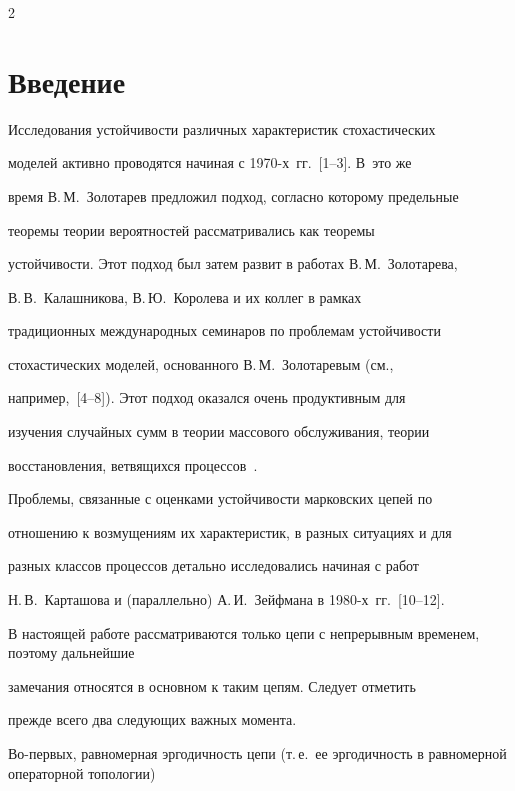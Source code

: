       \begin{multicols}{2}



            \label{st\stat}



\section{Введение}



Исследования устойчивости различных характеристик стохастических

моделей активно проводятся начиная с 1970-х~гг.~[1--3]. В~это же

время В.\,М.~Золотарев предложил подход, согласно которому предельные

теоремы теории вероятностей рассматривались как теоремы

устойчивости. Этот подход был затем развит в работах  В.\,М.~Золотарева,

В.\,В.~Калашникова, В.\,Ю.~Королева и их коллег в рамках

традиционных международных семинаров по проблемам устойчивости

стохастических моделей, основанного В.\,М.~Золотаревым (см.,

например,~[4--8]). Этот подход оказался очень продуктивным для

изучения случайных сумм в теории массового обслуживания, теории

восстановления, ветвящихся процессов~\cite{gk}.



Проблемы, связанные с оценками устойчивости марковских цепей по

отношению к возмущениям их характеристик, в разных ситуациях и для

разных классов процессов детально исследовались начиная с работ

Н.\,В.~Карташова и (параллельно) А.\,И.~Зейф\-ма\-на в 1980-х~гг.~[10--12].



В настоящей работе рассматриваются только цепи с непрерывным временем, поэтому дальнейшие

замечания относятся в основном к таким цепям. Следует отметить

прежде всего два следующих важных момента.



Во-первых, равномерная эргодичность цепи (т.\,е.\ ее эргодичность в равномерной операторной топологии)


\end{multicols}
